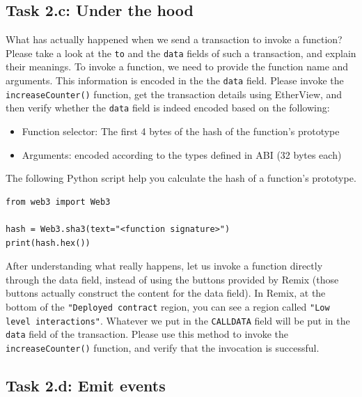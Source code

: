 \subsection{Task 2.c: Under the hood} 
\label{subsec:under_the_hood}


What has actually happened when we send a transaction to 
invoke a function? Please take a look at the \texttt{to} and  
the \texttt{data} fields of such a transaction, and 
explain their meanings. 
To invoke a function, we need to provide the function name
and arguments. This information is encoded in the 
the \texttt{data} field.
Please invoke the \texttt{increaseCounter()} function, 
get the transaction details using EtherView, and then
verify whether the \texttt{data} field is indeed encoded 
based on the following: 

\begin{itemize}[noitemsep]
\item Function selector: The first 4 bytes of the hash of the 
      function’s prototype
\item Arguments: encoded according to the types defined in ABI (32 bytes each)
\end{itemize}
 
The following Python script help you calculate the hash of a 
function's prototype. 

\begin{lstlisting}
from web3 import Web3

hash = Web3.sha3(text="<function signature>")
print(hash.hex())
\end{lstlisting}


After understanding what really happens, let us invoke a function
directly through the data field, instead of using the buttons provided
by Remix (those buttons actually construct the content for the data field). 
In Remix, at the bottom of the \texttt{"Deployed contract} region,  
you can see a region called \texttt{"Low level interactions"}.
Whatever we put in the \texttt{CALLDATA} field will be 
put in the \texttt{data} field of the transaction.  
Please use this method to invoke the \texttt{increaseCounter()}
function, and verify that the invocation is successful. 


\subsection{Task 2.d: Emit events} 


